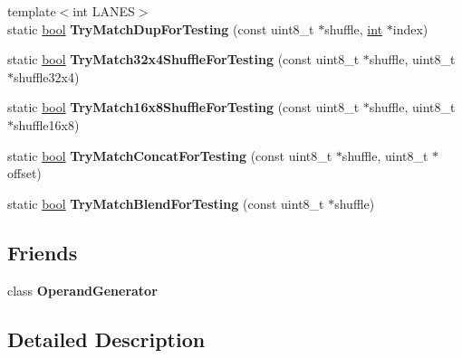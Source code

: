 \begin{DoxyCompactItemize}
{\footnotesize template$<$int L\+A\+N\+ES$>$ }\\static \mbox{\hyperlink{classbool}{bool}} {\bfseries Try\+Match\+Dup\+For\+Testing} (const uint8\+\_\+t $\ast$shuffle, \mbox{\hyperlink{classint}{int}} $\ast$index)
\item 
\mbox{\label{classv8_1_1internal_1_1compiler_1_1InstructionSelector_aa932e2871a4a1c89b2f26bf37a607a41}} 
static \mbox{\hyperlink{classbool}{bool}} {\bfseries Try\+Match32x4\+Shuffle\+For\+Testing} (const uint8\+\_\+t $\ast$shuffle, uint8\+\_\+t $\ast$shuffle32x4)
\item 
\mbox{\label{classv8_1_1internal_1_1compiler_1_1InstructionSelector_aeab6880545e873d11ed661a7d6e14f63}} 
static \mbox{\hyperlink{classbool}{bool}} {\bfseries Try\+Match16x8\+Shuffle\+For\+Testing} (const uint8\+\_\+t $\ast$shuffle, uint8\+\_\+t $\ast$shuffle16x8)
\item 
\mbox{\label{classv8_1_1internal_1_1compiler_1_1InstructionSelector_af27528b045c4614adb491b822bf73273}} 
static \mbox{\hyperlink{classbool}{bool}} {\bfseries Try\+Match\+Concat\+For\+Testing} (const uint8\+\_\+t $\ast$shuffle, uint8\+\_\+t $\ast$offset)
\item 
\mbox{\label{classv8_1_1internal_1_1compiler_1_1InstructionSelector_ac6528bb746eba724b12d5d26998ce506}} 
static \mbox{\hyperlink{classbool}{bool}} {\bfseries Try\+Match\+Blend\+For\+Testing} (const uint8\+\_\+t $\ast$shuffle)
\end{DoxyCompactItemize}
\subsection*{Friends}
\begin{DoxyCompactItemize}
\item 
\mbox{\label{classv8_1_1internal_1_1compiler_1_1InstructionSelector_a348308372de1bb413360ad7eff055f94}} 
class {\bfseries Operand\+Generator}
\end{DoxyCompactItemize}


\subsection{Detailed Description}


